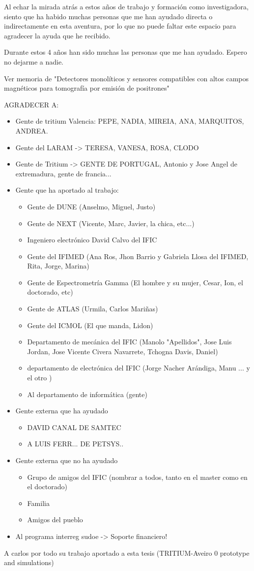 Al echar la mirada atrás a estos años de trabajo y formación como investigadora, siento que ha habido muchas personas que me han ayudado directa o indirectamente en esta aventura, por lo que no puede faltar este espacio para agradecer la ayuda que he recibido.

Durante estos 4 años han sido muchas las personas que me han ayudado. Espero no dejarme a nadie.

Ver memoria de "Detectores monolíticos y sensores compatibles con altos campos magnéticos para tomografía por emisión de positrones"


AGRADECER A:

\begin{itemize}
\item{} Gente de tritium Valencia: PEPE, NADIA, MIREIA, ANA, MARQUITOS, ANDREA.
\item{} Gente del LARAM -> TERESA, VANESA, ROSA, CLODO
\item{} Gente de Tritium -> GENTE DE PORTUGAL, Antonio y Jose Angel de extremadura, gente de francia...  
\item{} Gente que ha aportado al trabajo:
\begin{itemize}
\item{} Gente de DUNE (Anselmo, Miguel, Justo)
\item{} Gente de NEXT (Vicente, Marc, Javier, la chica, etc...)
\item{} Ingeniero electrónico David Calvo del IFIC
\item{} Gente del IFIMED (Ana Ros, Jhon Barrio y Gabriela Llosa del IFIMED, Rita, Jorge, Marina)
\item{} Gente de Espectrometría Gamma (El hombre y su mujer, Cesar, Ion, el doctorado, etc)
\item{} Gente de ATLAS (Urmila, Carlos Mariñas)
\item{} Gente del ICMOL (El que manda, Lidon)
\item{} Departamento de mecánica del IFIC (Manolo "Apellidos", Jose Luis Jordan, Jose Vicente Civera Navarrete, Tchogna Davis, Daniel)
\item{} departamento de electrónica del IFIC (Jorge Nacher Arándiga, Manu ... y el otro )
\item{} Al departamento de informática (gente)
\end{itemize}
\item{} Gente externa que ha ayudado
\begin{itemize}
\item{} DAVID CANAL DE SAMTEC
\item{} A LUIS FERR... DE PETSYS..
\end{itemize}
\item{} Gente externa que no ha ayudado
\begin{itemize}
\item{} Grupo de amigos del IFIC (nombrar a todos, tanto en el master como en el doctorado)
\item{} Familia
\item{} Amigos del pueblo
\end{itemize}
\item{} Al programa interreg sudoe -> Soporte financiero!
\end{itemize} 


A carlos por todo su trabajo aportado a esta tesis (TRITIUM-Aveiro 0 prototype and simulations)
